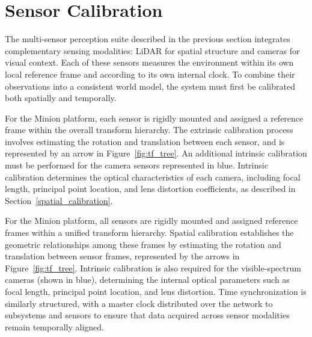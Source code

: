 \documentclass{erauthesis}
\begin{document}



\section{Sensor Calibration} \label{sec:calibration}

The multi-sensor perception suite described in the previous section integrates complementary sensing modalities: \ac{LiDAR} for spatial structure and cameras for visual context.
Each of these sensors measures the environment within its own local reference frame and according to its own internal clock.
To combine their observations into a consistent world model, the system must first be calibrated both spatially and temporally.

For the Minion platform, each sensor is rigidly mounted and assigned a reference frame within the overall transform hierarchy. 
The extrinsic calibration process involves estimating the rotation and translation between each sensor, and is represented by an arrow in Figure~\ref{fig:tf_tree}.
An additional intrinsic calibration must be performed for the camera sensors represented in blue.
Intrinsic calibration determines the optical characteristics of each camera, including focal length, principal point location, and lens distortion coefficients, as described in Section~\ref{spatial_calibration}.

For the Minion platform, all sensors are rigidly mounted and assigned reference frames within a unified transform hierarchy.
Spatial calibration establishes the geometric relationships among these frames by estimating the rotation and translation between sensor frames, represented by the arrows in Figure~\ref{fig:tf_tree}.  
Intrinsic calibration is also required for the visible-spectrum cameras (shown in blue), determining the internal optical parameters such as focal length, principal point location, and lens distortion. %
Time synchronization is similarly structured, with a master clock distributed over the network to subsystems and sensors to ensure that data acquired across sensor modalities remain temporally aligned.
\end{document}
